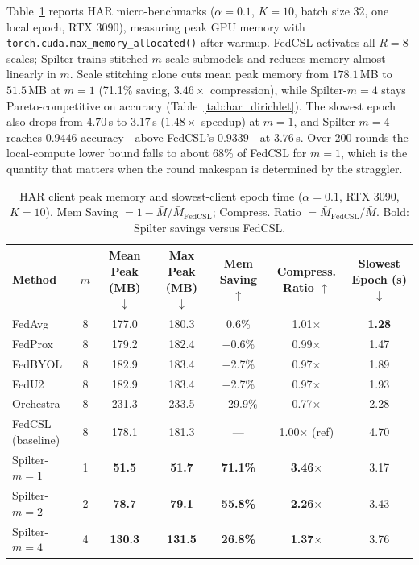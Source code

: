 \documentclass[sigconf]{acmart}
\begin{document}
Table~\ref{tab:har_memory} reports HAR micro-benchmarks ($\alpha=0.1$, $K=10$,
batch size 32, one local epoch, RTX 3090), measuring peak GPU memory with
\texttt{torch.cuda.max\_memory\_allocated()} after warmup. FedCSL activates all
$R=8$ scales; Spilter trains stitched $m$-scale submodels and reduces memory
almost linearly in $m$. Scale stitching alone cuts mean peak memory from
$178.1$\,MB to $51.5$\,MB at $m{=}1$ (71.1\% saving, $3.46\times$ compression),
while Spilter-$m{=}4$ stays Pareto-competitive on accuracy
(Table~\ref{tab:har_dirichlet}). The slowest epoch also drops from
$4.70$\,s to $3.17$\,s ($1.48\times$ speedup) at $m{=}1$, and Spilter-$m{=}4$
reaches $0.9446$ accuracy---above FedCSL's $0.9339$---at $3.76$\,s. Over 200
rounds the local-compute lower bound falls to about 68\% of FedCSL for $m{=}1$,
which is the quantity that matters when the round makespan is determined by the
straggler.

\begin{table}[t]
  \centering
  \caption{HAR client peak memory and slowest-client epoch time ($\alpha=0.1$,
  RTX 3090, $K=10$). Mem Saving $=1-\bar{M}/\bar{M}_{\mathrm{FedCSL}}$;
  Compress. Ratio $=\bar{M}_{\mathrm{FedCSL}}/\bar{M}$. Bold: Spilter savings
  versus FedCSL.}
  \label{tab:har_memory}
  \begin{tabular}{lcccccc}
    \toprule
    Method & $m$ & Mean Peak (MB) $\downarrow$ & Max Peak (MB) $\downarrow$
           & Mem Saving $\uparrow$ & Compress. Ratio $\uparrow$ & Slowest Epoch (s) $\downarrow$ \\
    \midrule
    FedAvg            & 8 & 177.0 & 180.3 & 0.6\%  & 1.01$\times$ & \textbf{1.28} \\
    FedProx           & 8 & 179.2 & 182.4 & $-$0.6\% & 0.99$\times$ & 1.47 \\
    FedBYOL           & 8 & 182.9 & 183.4 & $-$2.7\% & 0.97$\times$ & 1.89 \\
    FedU2             & 8 & 182.9 & 183.4 & $-$2.7\% & 0.97$\times$ & 1.93 \\
    Orchestra         & 8 & 231.3 & 233.5 & $-$29.9\% & 0.77$\times$ & 2.28 \\
    FedCSL (baseline) & 8 & 178.1 & 181.3 & --- & 1.00$\times$ (ref) & 4.70 \\
    \midrule
    Spilter-$m{=}1$   & 1 & \textbf{51.5} & \textbf{51.7} & \textbf{71.1\%} & \textbf{3.46$\times$} & 3.17 \\
    Spilter-$m{=}2$   & 2 & \textbf{78.7} & \textbf{79.1} & \textbf{55.8\%} & \textbf{2.26$\times$} & 3.43 \\
    Spilter-$m{=}4$   & 4 & \textbf{130.3} & \textbf{131.5} & \textbf{26.8\%} & \textbf{1.37$\times$} & 3.76 \\
    \bottomrule
  \end{tabular}
\end{table}
\end{document}
